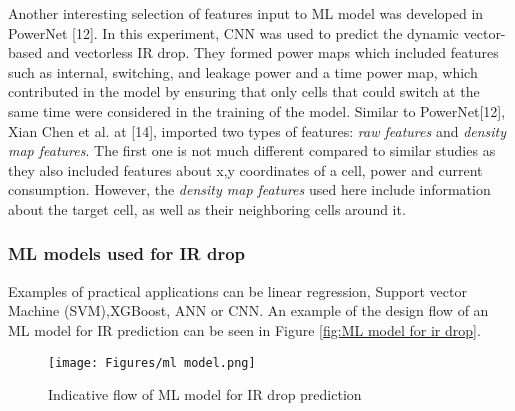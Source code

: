 Another interesting selection of features input to ML model was developed in PowerNet [12]. In this experiment, CNN was used to predict the dynamic vector-based and vectorless IR drop. They formed power maps which included features such as internal, switching, and leakage power and a time power map, which contributed in the model by ensuring that only cells that could switch at the same time were considered in the training of the model. Similar to PowerNet[12], Xian Chen et al. at [14], imported two types of features: \textit{raw features} and \textit{density map features}. The first one is not much different compared to similar studies as they also included features about x,y coordinates of a cell, power and current consumption. However, the \textit{density map features} used here include information about the target cell, as well as their neighboring cells around it.\\

\subsubsection{\textbf{ML models used for IR drop}}
Examples of practical applications can be linear regression, Support vector Machine (SVM),XGBoost, ANN or CNN. An example of the design flow of an ML model for IR prediction can be seen in Figure \ref{fig:ML model for ir drop}. \\


\begin{figure*}[t]
\centering
\texttt{[image: Figures/ml model.png]}
\caption{Indicative flow of ML model for IR drop prediction}
\label{fig:ML_model_for_ir_drop}
\end{figure*}
